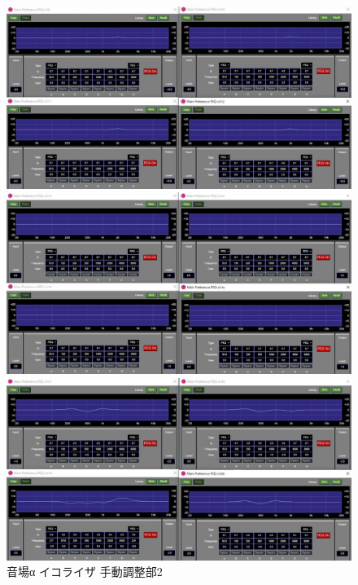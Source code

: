 \documentclass[11pt,a4j]{jreport}
\begin{document}
\begin{figure}[H]
  \begin{minipage}[b]{.5\linewidth}
    \centering
    \includegraphics[width=.9\linewidth]{images/experimentField/afcParameters/01alpha/05manualEQ8.jpg}
  \end{minipage}%
  \begin{minipage}[b]{.5\linewidth}
    \centering
    \includegraphics[width=.9\linewidth]{images/experimentField/afcParameters/01alpha/05manualEQ9.jpg}
  \end{minipage}

  \begin{minipage}[b]{1\linewidth}
    \centering
    \includegraphics[width=.45\linewidth]{images/experimentField/afcParameters/01alpha/05manualEQ10.jpg}
  \end{minipage}

  \centering
  \caption{音場α イコライザ 手動調整部2}
  \label{fig:alphaイコライザ手動調整部2}
\end{figure}
\end{document}
